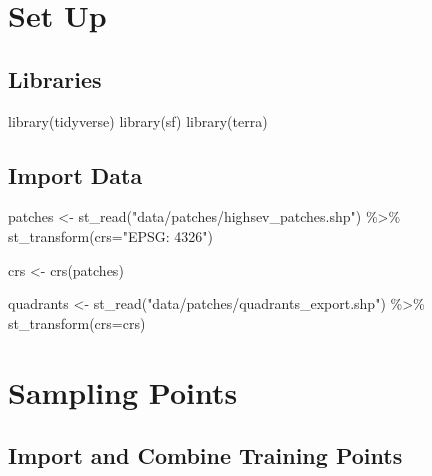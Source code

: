 \documentclass[
]{book}
\newenvironment{Shaded}{\begin{snugshade}}{\end{snugshade}}
\newcommand{\AttributeTok}[1]{\textcolor[rgb]{0.77,0.63,0.00}{#1}}
\newcommand{\FunctionTok}[1]{\textcolor[rgb]{0.00,0.00,0.00}{#1}}
\newcommand{\NormalTok}[1]{#1}
\newcommand{\OtherTok}[1]{\textcolor[rgb]{0.56,0.35,0.01}{#1}}
\newcommand{\SpecialCharTok}[1]{\textcolor[rgb]{0.00,0.00,0.00}{#1}}
\newcommand{\StringTok}[1]{\textcolor[rgb]{0.31,0.60,0.02}{#1}}
\begin{document}
\hypertarget{set-up-3}{%
\chapter{Set Up}\label{set-up-3}}

\hypertarget{libraries-2}{%
\section{Libraries}\label{libraries-2}}

\begin{Shaded}
\begin{Highlighting}[]
\FunctionTok{library}\NormalTok{(tidyverse)}
\FunctionTok{library}\NormalTok{(sf)}
\FunctionTok{library}\NormalTok{(terra)}
\end{Highlighting}
\end{Shaded}

\hypertarget{import-data-3}{%
\section{Import Data}\label{import-data-3}}

\begin{Shaded}
\begin{Highlighting}[]
\NormalTok{patches }\OtherTok{\textless{}{-}} \FunctionTok{st\_read}\NormalTok{(}\StringTok{"data/patches/highsev\_patches.shp"}\NormalTok{) }\SpecialCharTok{\%\textgreater{}\%} 
  \FunctionTok{st\_transform}\NormalTok{(}\AttributeTok{crs=}\StringTok{"EPSG: 4326"}\NormalTok{)}

\NormalTok{crs }\OtherTok{\textless{}{-}} \FunctionTok{crs}\NormalTok{(patches)}

\NormalTok{quadrants }\OtherTok{\textless{}{-}} \FunctionTok{st\_read}\NormalTok{(}\StringTok{"data/patches/quadrants\_export.shp"}\NormalTok{) }\SpecialCharTok{\%\textgreater{}\%} 
  \FunctionTok{st\_transform}\NormalTok{(}\AttributeTok{crs=}\NormalTok{crs)}
\end{Highlighting}
\end{Shaded}

\hypertarget{sampling-points}{%
\chapter{Sampling Points}\label{sampling-points}}

\hypertarget{import-and-combine-training-points}{%
\section{Import and Combine Training Points}\label{import-and-combine-training-points}}
\end{document}
